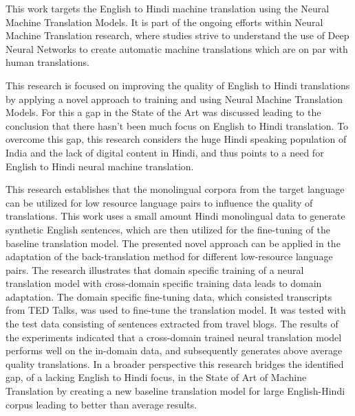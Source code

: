\documentclass[a4paper, 12pt, oneside]{report}         %
\begin{document}
\begin{thesissummary}                           %

This work targets the English to Hindi machine translation using the Neural Machine Translation Models. It is part of the ongoing efforts within Neural Machine Translation research, where studies strive to understand the use of Deep Neural Networks to create automatic machine translations which are on par with human translations.

This research is focused on improving the quality of English to Hindi translations by applying a novel approach to training and using Neural Machine Translation Models. For this a gap in the State of the Art was discussed leading to the conclusion that there hasn't been much focus on English to Hindi translation. To overcome this gap, this research considers the huge Hindi speaking population of India and the lack of digital content in Hindi, and thus points to a need for English to Hindi neural machine translation.

This research establishes that the monolingual corpora from the target language can be utilized for low resource language pairs to influence the quality of translations. This work uses a small amount Hindi monolingual data to generate synthetic English sentences, which are then utilized for the fine-tuning of the baseline translation model. The presented novel approach  can be applied in the adaptation of the back-translation method for different low-resource language pairs. The research illustrates that domain specific training of a neural translation model with cross-domain specific training data leads to domain adaptation. The domain specific fine-tuning data, which consisted transcripts from TED Talks, was used to fine-tune the translation model. It was tested with the test data consisting of sentences extracted from travel blogs. The results of the experiments indicated that a cross-domain trained neural translation model performs well on the in-domain data, and subsequently generates above average quality translations. In a broader perspective this research bridges the identified gap, of a lacking English to Hindi focus, in the State of Art of Machine Translation by creating a new baseline translation model for large English-Hindi corpus leading to better than average results.
	
\end{thesissummary}


\tableofcontents                                  %
\listoftables                                     %
\listoffigures                                    %
\end{document}
